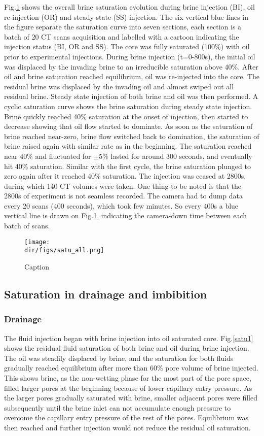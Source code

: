 Fig.\ref{satuall} shows the overall brine saturation evolution during brine injection (BI), oil re-injection (OR) and steady state (SS) injection. The six vertical blue lines in the figure separate the saturation curve into seven sections, each section is a batch of 20 CT scans acquisition and labelled with a cartoon indicating the injection status (BI, OR and SS). The core was fully saturated (100\%) with oil prior to experimental injections. During brine injection (t=0-800s), the initial oil was displaced by the invading brine to an irreducible saturation above 40\%. After oil and brine saturation reached equilibrium, oil was re-injected into the core. The residual brine was displaced by the invading oil and almost swiped out all residual brine. Steady state injection of both brine and oil was then performed. A cyclic saturation curve shows the brine saturation during steady state injection. Brine quickly reached 40\% saturation at the onset of injection, then started to decrease showing that oil flow started to dominate. As soon as the saturation of brine reached near-zero, brine flow switched back to domination, the saturation of brine raised again with similar rate as in the beginning. The saturation reached near 40\% and fluctuated for $\pm 5\%$ lasted for around 300 seconds, and eventually hit 40\% saturation. Similar with the first cycle, the brine saturation plunged to zero again after it reached 40\% saturation. The injection was ceased at 2800s, during which 140 CT volumes were taken. One thing to be noted is that the 2800s of experiment is not seamless recorded. The camera had to dump data every 20 scans (400 seconds), which took few minutes. So every 400s a blue vertical line is drawn on Fig.\ref{satuall}, indicating the camera-down time between each batch of scans. 


\begin{figure}
    \centering
    \texttt{[image: \\dir/figs/satu\_all.png]}
    \caption{Caption}
    \label{satuall}
\end{figure}

\subsection{Saturation in drainage and imbibition}  
\subsubsection{Drainage}
The fluid injection began with brine injection into oil saturated core. Fig.\ref{satu1} shows the residual fluid saturation of both brine and oil during brine injection. The oil was steadily displaced by brine, and the saturation for both fluids gradually reached equilibrium after more than 60\% pore volume of brine injected. This shows brine, as the non-wetting phase for the most part of the pore space, filled larger pores at the beginning because of lower capillary entry pressure. As the larger pores gradually saturated with brine, smaller adjacent pores were filled subsequently until the brine inlet can not accumulate enough pressure to overcome the capillary entry pressure of the rest of the pores. Equilibrium was then reached and further injection would not reduce the residual oil saturation.

